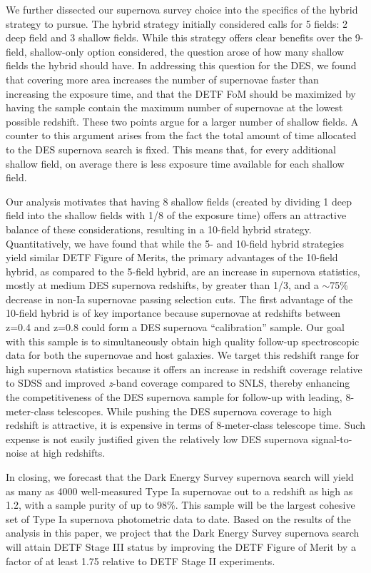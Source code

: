 \documentclass[preprint2]{aastex}    %
\begin{document}
We further dissected our supernova survey choice into the specifics of the hybrid strategy
to pursue. The hybrid strategy initially considered calls for 5 fields: 2 deep field and 3 shallow
fields. 
While this strategy offers clear benefits over the 9-field, shallow-only option considered, 
the question arose of how many shallow fields %
the hybrid should have.
In addressing this question for the DES, we found that covering more area increases the 
number of supernovae faster than increasing the exposure time, and that the DETF FoM should be 
maximized by having the sample contain the maximum number of supernovae at the 
lowest possible redshift. These two points argue for a larger number of shallow fields.
A counter to this argument arises from the fact the total amount of time allocated to the
DES supernova search is fixed. This means that, for every additional shallow field, on average 
there is less exposure time available for each shallow field. 

Our analysis motivates
that having 8 shallow fields (created by dividing 1 deep field into the shallow fields with 1/8 
of the exposure time) offers an attractive balance of these considerations, resulting in a
10-field hybrid strategy. Quantitatively, we have found that while the 5- and 10-field hybrid strategies 
yield similar DETF Figure of Merits, the primary advantages of 
the 10-field hybrid, as compared to the 5-field hybrid, are an increase in supernova statistics, 
mostly at medium DES supernova redshifts, by greater than 1/3, and a $\sim$75\% decrease in non-Ia 
supernovae passing selection cuts.
The first advantage of the 10-field hybrid is of key importance because supernovae at redshifts between 
z=0.4 and z=0.8 could form a DES supernova ``calibration'' sample. Our goal with this sample 
is to simultaneously obtain high quality follow-up spectroscopic data for both the 
supernovae and host galaxies. We target this redshift range for high supernova statistics because it offers 
an increase in redshift coverage relative to SDSS and improved \textit{z}-band coverage 
compared to SNLS, thereby enhancing the competitiveness of the DES supernova sample for 
follow-up with leading, 8-meter-class telescopes. While pushing the DES supernova coverage to high
redshift is attractive, it is expensive in terms of 8-meter-class telescope time. Such expense is
not easily justified given the relatively low DES supernova signal-to-noise at high redshifts.

In closing, we forecast that the Dark Energy Survey supernova search will yield as many as 4000 
well-measured Type Ia supernovae out to a redshift as high as 1.2, with a sample purity of up to 98\%. This 
sample will be the largest cohesive set of Type Ia supernova photometric data to date. Based on the results of the analysis in this paper, we project that the 
Dark Energy Survey supernova search will attain DETF Stage III status \citep{alb06} by improving 
the DETF Figure of Merit by a factor of at least 1.75 relative to DETF Stage II experiments.
 
\end{document}
